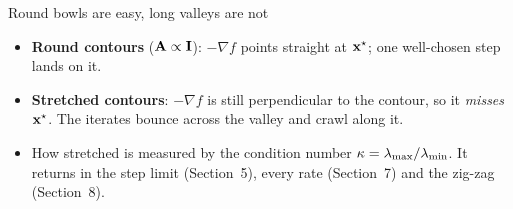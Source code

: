 \begin{frame}{Round bowls are easy, long valleys are not}
  \centering
  

  \vspace{4pt}
  \raggedright
  \begin{itemize}\small
    \item \textbf{Round contours} ($\mathbf{A}\propto\mathbf{I}$): $-\nabla f$ points straight at $\mathbf{x}^\star$; one well-chosen step lands on it.
    \item \textbf{Stretched contours}: $-\nabla f$ is still perpendicular to the contour, so it \emph{misses} $\mathbf{x}^\star$.
          The iterates bounce across the valley and crawl along it.
    \item How stretched is measured by the \alert{condition number} $\kappa = \lambda_{\max}/\lambda_{\min}$. It returns in the step limit (Section~5),
          every rate (Section~7) and the zig-zag (Section~8).
  \end{itemize}
\end{frame}
